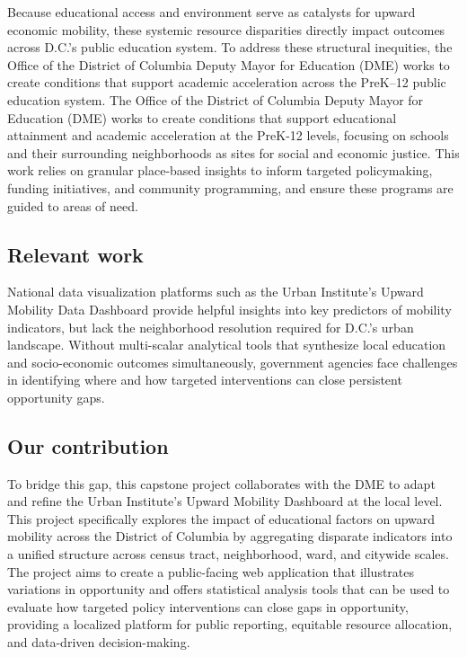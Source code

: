 \documentclass[
  letterpaper,
  DIV=11,
  numbers=noendperiod]{scrartcl}
\begin{document}
Because educational access and environment serve as catalysts for upward
economic mobility, these systemic resource disparities directly impact
outcomes across D.C.'s public education system. To address these
structural inequities, the Office of the District of Columbia Deputy
Mayor for Education (DME) works to create conditions that support
academic acceleration across the PreK--12 public education system. The
Office of the District of Columbia Deputy Mayor for Education (DME)
works to create conditions that support educational attainment and
academic acceleration at the PreK-12 levels, focusing on schools and
their surrounding neighborhoods as sites for social and economic
justice. This work relies on granular place-based insights to inform
targeted policymaking, funding initiatives, and community programming,
and ensure these programs are guided to areas of need.

\subsection{Relevant work}\label{relevant-work}

National data visualization platforms such as the Urban Institute's
Upward Mobility Data Dashboard provide helpful insights into key
predictors of mobility indicators, but lack the neighborhood resolution
required for D.C.'s urban landscape. Without multi-scalar analytical
tools that synthesize local education and socio-economic outcomes
simultaneously, government agencies face challenges in identifying where
and how targeted interventions can close persistent opportunity gaps.

\subsection{Our contribution}\label{our-contribution}

To bridge this gap, this capstone project collaborates with the DME to
adapt and refine the Urban Institute's Upward Mobility Dashboard at the
local level. This project specifically explores the impact of
educational factors on upward mobility across the District of Columbia
by aggregating disparate indicators into a unified structure across
census tract, neighborhood, ward, and citywide scales. The project aims
to create a public-facing web application that illustrates variations in
opportunity and offers statistical analysis tools that can be used to
evaluate how targeted policy interventions can close gaps in
opportunity, providing a localized platform for public reporting,
equitable resource allocation, and data-driven decision-making.
\end{document}
